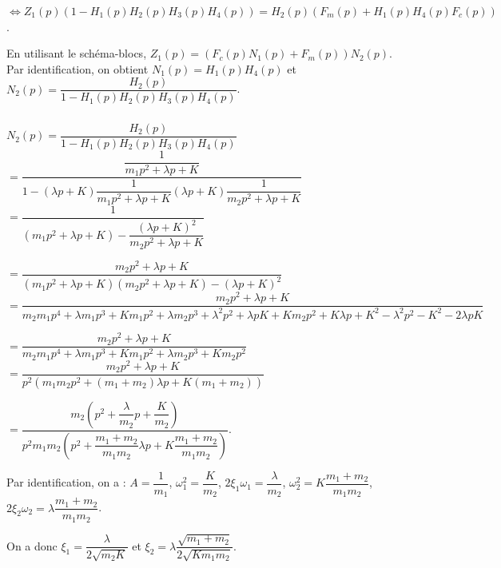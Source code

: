\documentclass[10pt,fleqn]{article} %
\begin{document}
$\Leftrightarrow Z_1(p)\left( 1-H_1(p)H_2(p) H_3(p)H_4(p)\right)=H_2(p)\left(F_m(p)+H_1(p)H_4(p)F_c(p)\right) $. 

En utilisant le schéma-blocs, $Z_1(p)=\left(F_c(p)N_1(p)+F_m(p)\right)N_2(p)$. 
Par identification, on obtient $N_1(p)=H_1(p)H_4(p)$ et $N_2(p)=\dfrac{H_2(p)}{1-H_1(p)H_2(p) H_3(p)H_4(p)}$.


\subparagraph{}

$N_2(p)=\dfrac{H_2(p)}{1-H_1(p)H_2(p) H_3(p)H_4(p)}$ 
$= \dfrac{\dfrac{1}{m_1p^2  + \lambda p+K}}{1-\left(\lambda p+K\right)\dfrac{1}{m_1p^2  + \lambda p+K} \left(\lambda p+K\right)\dfrac{1}{m_2p^2  + \lambda p+K}}$
$= \dfrac{1}{\left(m_1p^2  + \lambda p+K\right)- \dfrac{\left(\lambda p+K\right)^2}{m_2p^2  + \lambda p+K}}$

$= \dfrac{m_2p^2  + \lambda p+K}{\left(m_1p^2  + \lambda p+K\right)\left(m_2p^2  + \lambda p+K\right)- \left(\lambda p+K\right)^2}$
$= \dfrac{m_2p^2  + \lambda p+K}{
m_2m_1p^4  + \lambda m_1p^3+Km_1p^2+\lambda m_2p^3  + \lambda^2 p^2 +\lambda pK+Km_2p^2  + K\lambda p+K^2 - \lambda^2 p^2 -K^2 - 2\lambda p K}$

$= \dfrac{m_2p^2  + \lambda p+K}{
m_2m_1p^4  + \lambda m_1p^3+Km_1p^2+\lambda m_2p^3   +Km_2p^2 }$
$= \dfrac{m_2p^2  + \lambda p+K}{
p^2\left( m_1m_2p^2  + \left(m_1+ m_2\right) \lambda p  +K\left(m_1+m_2\right)\right) }$

$= \dfrac{m_2\left(p^2  + \dfrac{\lambda}{m_2}p+\dfrac{K}{m_2}\right)}{
p^2 m_1m_2 \left(p^2  + \dfrac{m_1+ m_2}{m_1m_2} \lambda p  +K\dfrac{m_1+m_2}{m_1m_2}\right) }$.

Par identification, on a : $A=\dfrac{1}{m_1}$, $\omega_1^2=\dfrac{K}{m_2}$, $2\xi_1\omega_1=\dfrac{\lambda}{m_2}$, $\omega_2^2=K\dfrac{m_1+m_2}{m_1m_2}$, $2\xi_2\omega_2=\lambda\dfrac{m_1+ m_2}{m_1m_2}$. 

On a donc $\xi_1=\dfrac{\lambda}{2  \sqrt{m_2K}}$ et 
$\xi_2=\lambda\dfrac{\sqrt{m_1+ m_2}}{2\sqrt{Km_1m_2}}$.
\end{document}
